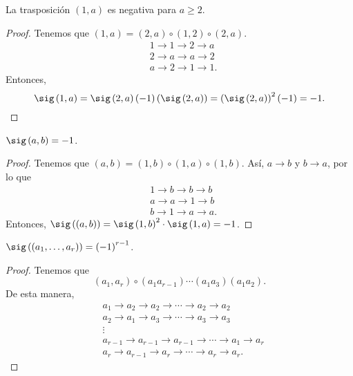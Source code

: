\begin{fprop}[]
\normalfont La trasposición $\displaystyle \left(1,a\right) $ es negativa para $\displaystyle a \geq 2 $. 
\end{fprop}

\begin{proof}
Tenemos que $\displaystyle \left(1, a\right) = \left(2 , a\right) \circ \left(1,2\right) \circ \left(2,a\right) $. 
\[
\begin{split}
& 1 \to 1 \to 2 \to a \\
& 2 \to a \to a \to 2 \\
& a \to 2 \to 1 \to 1.
\end{split}
\]
Entonces, 
\[\sig\left(1,a\right) = \sig\left(2,a\right)\left(-1\right)\left(\sig\left(2,a\right)\right) = \left(\sig\left(2,a\right)\right)^{2}\left(-1\right) = -1 .\]
\end{proof}

\begin{fprop}[]
\normalfont $\displaystyle \sig\left(a,b\right) = -1$.
\end{fprop}

\begin{proof}
Tenemos que $\displaystyle \left(a,b\right) = \left(1, b\right) \circ \left(1,a\right) \circ \left(1,b\right) $. Así, $\displaystyle a \to b $ y $\displaystyle b \to a $, por lo que
\[
\begin{split}
& 1 \to b \to b \to b \\
& a \to a \to 1 \to b \\
& b \to 1 \to a \to a.
\end{split}
\]
Entonces, $\displaystyle \sig\left(\left(a,b\right)\right) = \sig\left(1,b\right)^{2} \cdot \sig\left(1,a\right) = -1 $.
\end{proof}

\begin{fprop}[]
\normalfont $\displaystyle \sig\left(\left(a_{1}, \ldots, a_{r}\right)\right) = \left(-1\right)^{r-1} $.
\end{fprop}

\begin{proof}
Tenemos que 
\[\left(a_{1}, a_{r}\right) \circ \left(a_{1}a_{r-1}\right) \cdots \left(a_{1}a_{3}\right)\left(a_{1}a_{2}\right) .\]
De esta manera, 
\[
\begin{split}
& a_{1} \to a_{2} \to a_{2} \to \cdots \to a_{2} \to a_{2}\\
& a_{2} \to a_{1} \to a_{3} \to \cdots \to a_{3} \to a_{3} \\
& \vdots \\
& a_{r-1} \to a_{r-1} \to a_{r-1} \to \cdots \to a_{1} \to a_{r} \\
& a_{r} \to a_{r-1} \to a_{r} \to \cdots \to a_{r} \to a_{r}.
\end{split}
\]
\end{proof}


